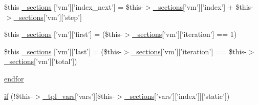 \begin{DoxyCompactItemize}
\item 
\$this \hyperlink{34d6fa4bfd5eef6424a9ddc74a166350_2_06_06708_05_06_06708843835_05var_8tpl_8php_a9e8099a0c3f31c65756de11de68b48ef}{\-\_\-sections} \mbox{[}'vm'\mbox{]}\mbox{[}'index\-\_\-next'\mbox{]} = \$this-\/$>$\hyperlink{_06_06127_05_06_0612781687_05pkgelementindex_8tpl_8php_a9e3d26b39edfe29c3f29b8035ef33828}{\-\_\-sections}\mbox{[}'vm'\mbox{]}\mbox{[}'index'\mbox{]} + \$this-\/$>$\hyperlink{_06_06127_05_06_0612781687_05pkgelementindex_8tpl_8php_a9e3d26b39edfe29c3f29b8035ef33828}{\-\_\-sections}\mbox{[}'vm'\mbox{]}\mbox{[}'step'\mbox{]}
\item 
\$this \hyperlink{34d6fa4bfd5eef6424a9ddc74a166350_2_06_06708_05_06_06708843835_05var_8tpl_8php_a1979b6a549699d03f7261bfaf97f55b6}{\-\_\-sections} \mbox{[}'vm'\mbox{]}\mbox{[}'first'\mbox{]} = (\$this-\/$>$\hyperlink{_06_06127_05_06_0612781687_05pkgelementindex_8tpl_8php_a9e3d26b39edfe29c3f29b8035ef33828}{\-\_\-sections}\mbox{[}'vm'\mbox{]}\mbox{[}'iteration'\mbox{]} == 1)
\item 
\$this \hyperlink{34d6fa4bfd5eef6424a9ddc74a166350_2_06_06708_05_06_06708843835_05var_8tpl_8php_a0bc2ced44d01c7f847468e15b4ce6d3f}{\-\_\-sections} \mbox{[}'vm'\mbox{]}\mbox{[}'last'\mbox{]} = (\$this-\/$>$\hyperlink{_06_06127_05_06_0612781687_05pkgelementindex_8tpl_8php_a9e3d26b39edfe29c3f29b8035ef33828}{\-\_\-sections}\mbox{[}'vm'\mbox{]}\mbox{[}'iteration'\mbox{]} == \$this-\/$>$\hyperlink{_06_06127_05_06_0612781687_05pkgelementindex_8tpl_8php_a9e3d26b39edfe29c3f29b8035ef33828}{\-\_\-sections}\mbox{[}'vm'\mbox{]}\mbox{[}'total'\mbox{]})
\item 
\hyperlink{34d6fa4bfd5eef6424a9ddc74a166350_2_06_06708_05_06_06708843835_05var_8tpl_8php_ae8fdc27183f296411bac00ed522ee1ac}{endfor}
\item 
\hyperlink{34d6fa4bfd5eef6424a9ddc74a166350_2_06_06708_05_06_06708843835_05var_8tpl_8php_aa32014f5e29c115679086156fae6639f}{if} (!\$this-\/$>$\hyperlink{_06_06127_05_06_0612781687_05pkgelementindex_8tpl_8php_a4a4846d8e68d455590131a05697f67a3}{\-\_\-tpl\-\_\-vars}\mbox{[}'vars'\mbox{]}\mbox{[}\$this-\/$>$\hyperlink{_06_06127_05_06_0612781687_05pkgelementindex_8tpl_8php_a9e3d26b39edfe29c3f29b8035ef33828}{\-\_\-sections}\mbox{[}'vars'\mbox{]}\mbox{[}'index'\mbox{]}\mbox{]}\mbox{[}'static'\mbox{]})
\end{DoxyCompactItemize}



